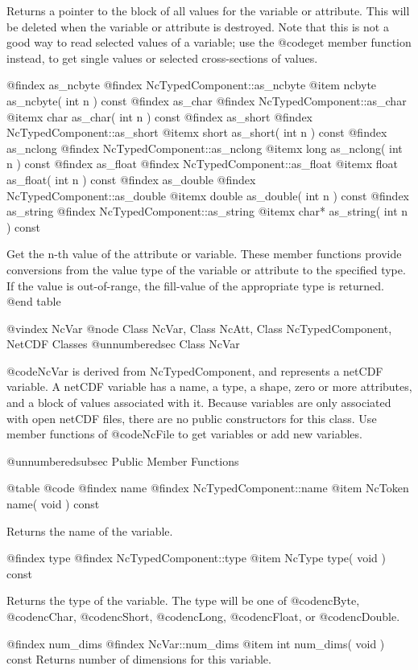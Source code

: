 Returns a pointer to the block of all values for the variable or
attribute.  This will be deleted when the variable or attribute is
destroyed.  Note that this is not a good way to read selected values of
a variable; use the @code{get} member function instead, to get single
values or selected cross-sections of values.

@findex as_ncbyte
@findex NcTypedComponent::as_ncbyte
@item ncbyte as_ncbyte( int n ) const
@findex as_char
@findex NcTypedComponent::as_char
@itemx char as_char( int n ) const
@findex as_short
@findex NcTypedComponent::as_short
@itemx short as_short( int n ) const
@findex as_nclong
@findex NcTypedComponent::as_nclong
@itemx long as_nclong( int n ) const
@findex as_float
@findex NcTypedComponent::as_float
@itemx float as_float( int n ) const
@findex as_double
@findex NcTypedComponent::as_double
@itemx double as_double( int n ) const
@findex as_string
@findex NcTypedComponent::as_string
@itemx char* as_string( int n ) const

Get the n-th value of the attribute or variable.  These member functions
provide conversions from the value type of the variable or attribute to
the specified type.  If the value is out-of-range, the
fill-value of the appropriate type is returned.
@end table


@vindex NcVar
@node Class NcVar, Class NcAtt, Class NcTypedComponent, NetCDF Classes
@unnumberedsec  Class NcVar

@code{NcVar} is derived from NcTypedComponent, and represents a netCDF
variable.  A netCDF variable has a name, a type, a shape, zero or more
attributes, and a block of values associated with it.  Because variables
are only associated with open netCDF files, there are no public
constructors for this class.  Use member functions of @code{NcFile} to
get variables or add new variables.

@unnumberedsubsec Public Member Functions

@table @code
@findex name
@findex NcTypedComponent::name
@item NcToken name( void ) const

Returns the name of the variable.

@findex type
@findex NcTypedComponent::type
@item NcType type( void ) const

Returns the type of the variable.  The type will be one of
@code{ncByte}, @code{ncChar}, @code{ncShort}, @code{ncLong},
@code{ncFloat}, or @code{ncDouble}.

@findex num_dims
@findex NcVar::num_dims
@item int num_dims( void ) const
Returns number of dimensions for this variable.

